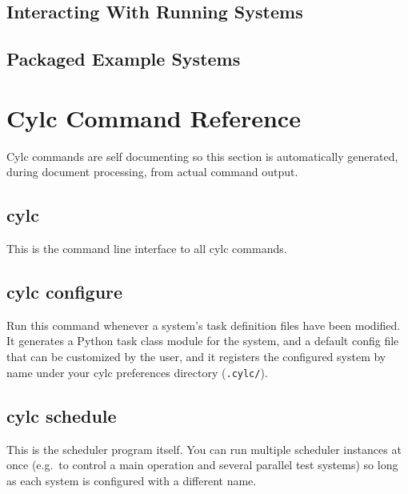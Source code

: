 \documentclass[11pt,a4paper]{article}
\begin{document}
\subsection{Interacting With Running Systems}

\subsection{Packaged Example Systems}

\pagebreak
\section{Cylc Command Reference}


Cylc commands are self documenting so this section is automatically
generated, during document processing, from actual command output.

\subsection{cylc}

\lstset{language=usage}

This is the command line interface to all cylc commands.

{

}

\pagebreak
\subsection{cylc configure}

Run this command whenever a system's task definition files have been
modified. It generates a Python task class module for the system, and a
default config file that can be customized by the user, and it registers
the configured system by name under your cylc preferences directory
(\lstinline=.cylc/=).

{ 
 
}

\pagebreak
\subsection{cylc schedule}

This is the scheduler program itself. You can run multiple scheduler
instances at once (e.g.\ to control a main operation and several
parallel test systems) so long as each system is configured with a
different name. 
{

}
\end{document}
